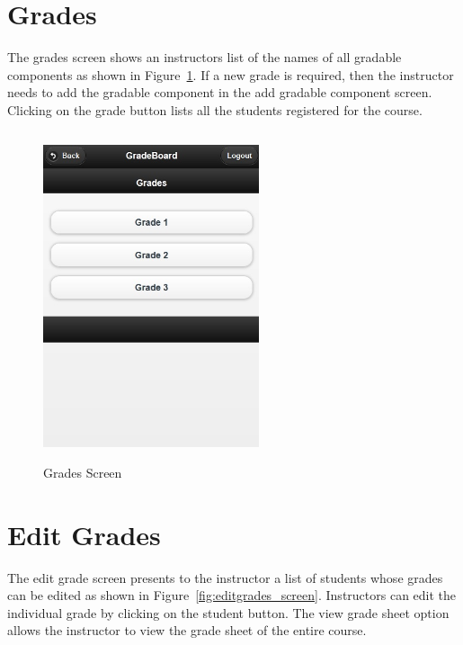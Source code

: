 \newpage
\section{Grades}
The grades screen shows an instructors list of the names of all gradable components as shown in Figure~\ref{fig:grades_screen}. If a new grade is required, then the instructor needs to add the gradable component in the add gradable component screen. Clicking on the grade button lists all the students registered for the course.

\vspace{3em}
\begin{figure}[H]
\begin{center}
\includegraphics[height=3.8in,width=2.5in]{images/grades_screen.jpg}
\caption{Grades Screen}
\label{fig:grades_screen}
\end{center}
\end{figure}

\newpage
\section{Edit Grades}
The edit grade screen presents to the instructor a list of students whose grades can be edited as shown in Figure~\ref{fig:editgrades_screen}. Instructors can edit the individual grade by clicking on the student button. The view grade sheet option allows the instructor to view the grade sheet of the entire course.

